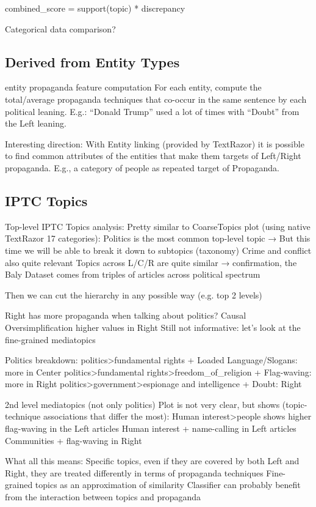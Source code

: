 combined\_score = support(topic) * discrepancy

Categorical data comparison?



\subsection{Derived from Entity Types}

entity propaganda feature computation
For each entity, compute the total/average propaganda techniques that co-occur in the same sentence by each political leaning. E.g.: “Donald Trump” used a lot of times with “Doubt” from the Left leaning.

Interesting direction:
With Entity linking (provided by TextRazor) it is possible to find common attributes of the entities that make them targets of Left/Right propaganda. E.g., a category of people as repeated target of Propaganda.

\subsection{IPTC Topics}

Top-level IPTC Topics analysis:
Pretty similar to CoarseTopics plot (using native TextRazor 17 categories):
Politics is the most common top-level topic → But this time we will be able to break it down to subtopics (taxonomy)
Crime and conflict also quite relevant
Topics across L/C/R are quite similar → confirmation, the Baly Dataset comes from triples of articles across political spectrum

Then we can cut the hierarchy in any possible way (e.g. top 2 levels)

Right has more propaganda when talking about politics?
Causal Oversimplification higher values in Right
Still not informative: let’s look at the fine-grained mediatopics

Politics breakdown:
politics>fundamental rights + Loaded Language/Slogans: more in Center
politics>fundamental rights>freedom\_of\_religion + Flag-waving: more in Right
politics>government>espionage and intelligence + Doubt: Right

2nd level mediatopics (not only politics)
Plot is not very clear, but shows (topic-technique associations that differ the most):
Human interest>people shows higher flag-waving in the Left articles
Human interest + name-calling in Left articles
Communities + flag-waving in Right

What all this means:
Specific topics, even if they are covered by both Left and Right, they are treated differently in terms of propaganda techniques
Fine-grained topics as an approximation of similarity
Classifier can probably benefit from the interaction between topics and propaganda

